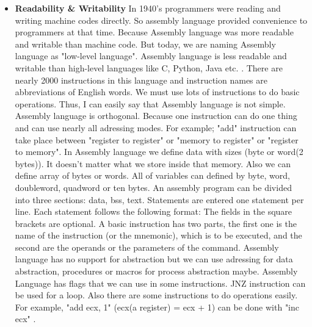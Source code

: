 \documentclass[11pt]{article}
\begin{document}
\begin{itemize}
	\item  {{\bf Readability \& Writability }}
	\newline In 1940's programmers were reading and writing machine codes directly. So assembly language provided convenience to programmers at that time. Because Assembly language was more readable and writable than machine code. But today, we are naming Assembly language as "low-level language". Assembly language is less readable and writable than high-level languages like C, Python, Java etc. . 
	 There are nearly 2000 instructions in this language and instruction names are abbreviations of English words. We must use lots of instructions to do basic operations. Thus, I can easily say that Assembly language is not simple. 
	 Assembly language is orthogonal. Because one instruction can do one thing and can use nearly all adressing modes. For example; "add" instruction can take place between "register to register" or "memory to register" or "register to memory".
	 In Assembly language we define data with sizes (byte or word(2 bytes)). It doesn't matter what we store inside that memory. Also we can define array of bytes or words.  All of variables can defined by byte, word, doubleword, quadword or ten bytes. 
	 An assembly program can be divided into three sections: data, bss, text. Statements are entered one statement per line. Each statement follows the following format:
	\newline The fields in the square brackets are optional. A basic instruction has two parts, the first one is the name of the instruction (or the mnemonic), which is to be executed, and the second are the operands or the parameters of the command.
	 Assembly language has no support for abstraction but we can use adressing for data abstraction, procedures or macros for process abstraction maybe.
	 Assembly Language has flags that we can use in some instructions. JNZ instruction can be used for a loop. Also there are some instructions to do operations easily.
	\newline For example, "add ecx, 1" (ecx(a register) = ecx + 1) can be done with "inc ecx" .


\end{itemize}
\end{document}
